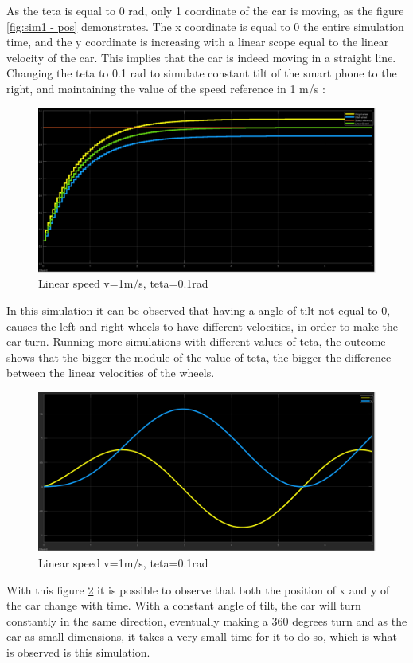As the teta is equal to 0 rad, only 1 coordinate of the car is moving, as the figure \ref{fig:sim1 - pos} demonstrates. The x coordinate is equal to 0 the entire simulation time, and the y coordinate is increasing with a linear scope equal to the linear velocity of the car. This implies that the car is indeed moving in a straight line.\\
\newpage
Changing the teta to 0.1 rad to simulate constant tilt of the smart phone to the right, and maintaining the value of the speed reference in 1 m/s :\
\begin{figure}[!h]
\centering
\includegraphics[width=1.0\textwidth]{./img/vel101.png}
\caption {\label{fig:sim2 - vel}Linear speed v=1m/s, teta=0.1rad}
\end{figure}
In this simulation it can be observed that having a angle of tilt not equal to 0, causes the left and right wheels to have different velocities, in order to make the car turn. Running more simulations with different values of teta, the outcome shows that the bigger the module of the value of teta, the bigger the difference between the linear velocities of the wheels.
\begin{figure}[!ht]
\centering
\includegraphics[width=1.0\textwidth]{./img/xy101.png}
\caption {\label{fig:sim2 - pos}Linear speed v=1m/s, teta=0.1rad}
\end{figure}
With this figure \ref{fig:sim2 - pos} it is possible to observe that both the
position of x and y of the car change with time. With a constant angle of tilt,
the car will turn constantly in the same direction, eventually making a 360
degrees turn and as the car as small dimensions, it takes a very small time for
it to do so, which is what is observed is this simulation.
